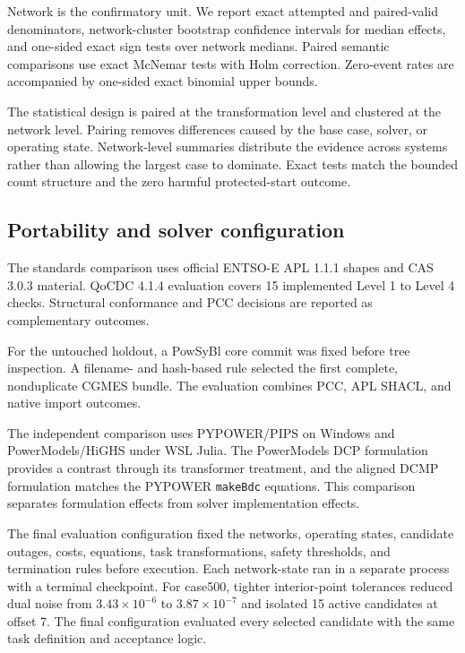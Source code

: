 \documentclass[preprint,12pt]{elsarticle}
\begin{document}
Network is the confirmatory unit. We report exact attempted and paired-valid denominators, network-cluster bootstrap confidence intervals for median effects, and one-sided exact sign tests over network medians. Paired semantic comparisons use exact McNemar tests with Holm correction. Zero-event rates are accompanied by one-sided exact binomial upper bounds.

The statistical design is paired at the transformation level and clustered at the network level. Pairing removes differences caused by the base case, solver, or operating state. Network-level summaries distribute the evidence across systems rather than allowing the largest case to dominate. Exact tests match the bounded count structure and the zero harmful protected-start outcome.

\subsection{Portability and solver configuration}

The standards comparison uses official ENTSO-E APL 1.1.1 shapes and CAS 3.0.3 material. QoCDC 4.1.4 evaluation covers 15 implemented Level 1 to Level 4 checks. Structural conformance and PCC decisions are reported as complementary outcomes.

For the untouched holdout, a PowSyBl core commit was fixed before tree inspection. A filename- and hash-based rule selected the first complete, nonduplicate CGMES bundle. The evaluation combines PCC, APL SHACL, and native import outcomes.

The independent comparison uses PYPOWER/PIPS on Windows and PowerModels/HiGHS under WSL Julia. The PowerModels DCP formulation provides a contrast through its transformer treatment, and the aligned DCMP formulation matches the PYPOWER \texttt{makeBdc} equations. This comparison separates formulation effects from solver implementation effects.

The final evaluation configuration fixed the networks, operating states, candidate outages, costs, equations, task transformations, safety thresholds, and termination rules before execution. Each network-state ran in a separate process with a terminal checkpoint. For case500, tighter interior-point tolerances reduced dual noise from $3.43\times10^{-6}$ to $3.87\times10^{-7}$ and isolated 15 active candidates at offset 7. The final configuration evaluated every selected candidate with the same task definition and acceptance logic.
\end{document}
